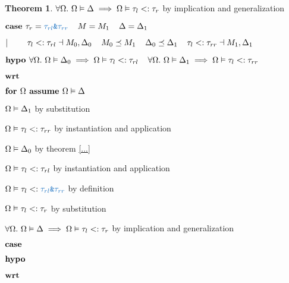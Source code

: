 \documentclass[acmsmall]{acmart}
\theoremstyle{definition}
\newtheorem{theorem}{Theorem}[section]
\begin{document}
\begin{theorem}
      \item \Z\Z $\forall \Omega .\ \Omega \vDash \Delta \implies \Omega \vDash \tau_l <: \tau_r$ 
      by implication and generalization

    \item \Z $\B{case } 
      \tau_r = \obj{$\tau_{rl}$\&$\tau_{rr}$}
      \I
      M = M_1
      \I
      \Delta = \Delta_1
    $
    \item \Z $|\ \ \ \ \ \ \  
      \tau_l <: \tau_{rl} \dashv M_0, \Delta_0
      \hspace{4mm}
      M_0 \preceq M_1
      \hspace{4mm}
      \Delta_0 \preceq \Delta_1
      \hspace{4mm}
      \tau_l <: \tau_{rr} \dashv M_1, \Delta_1
    $
    \item \Z $\textbf{hypo } 
      \forall \Omega .\ \Omega \vDash \Delta_0 \implies \Omega \vDash \tau_l <: \tau_{rl} 
      \hspace{4mm}
      \forall \Omega .\ \Omega \vDash \Delta_1 \implies \Omega \vDash \tau_l <: \tau_{rr} 
    $
    \item \Z $\textbf{wrt } $
      \item \Z\Z $\textbf{for } \Omega \textbf{ assume } \Omega \vDash \Delta$
        \item \Z\Z\Z $\Omega \vDash \Delta_1 $ by substitution
        \item \Z\Z\Z $\Omega \vDash \tau_l <: \tau_{rr}$ by instantiation and application 
        \item \Z\Z\Z $\Omega \vDash \Delta_0 $ by theorem \ref{...}  
        \item \Z\Z\Z $\Omega \vDash \tau_l <: \tau_{rl}$ by instantiation and application 
        \item \Z\Z\Z $\Omega \satisfies \tau_l \subtypes \obj{$\tau_{rl}$\&$\tau_{rr}$}$ by definition 
        \item \Z\Z\Z $\Omega \vDash \tau_l <: \tau_r$ by substitution
      \item \Z\Z $\forall \Omega .\ \Omega \vDash \Delta \implies \Omega \vDash \tau_l <: \tau_r$ 
      by implication and generalization


    \item \Z $\textbf{case } $
    \item \Z $\textbf{hypo } $
    \item \Z $\textbf{wrt } $
      \item \Z\Z {} 


\end{theorem}
\end{document}

